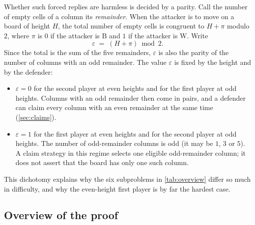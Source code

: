 \documentclass[11pt,a4paper]{article}
\theoremstyle{plain}
\theoremstyle{definition}
\newcommand{\B}{\mathrm{B}}
\newcommand{\W}{\mathrm{W}}
\newcommand{\eps}{\varepsilon}
\begin{document}
Whether such forced replies are harmless is decided by a parity. Call the number of empty cells of a column its \emph{remainder}. When the attacker is to move on a board of height $H$, the total number of empty cells is congruent to $H+\pi$ modulo $2$, where $\pi$ is $0$ if the attacker is $\B$ and $1$ if the attacker is $\W$. Write
\[
\eps \;=\; (H+\pi) \bmod 2 .
\]
Since the total is the sum of the five remainders, $\eps$ is also the parity of the number of columns with an odd remainder. The value $\eps$ is fixed by the height and by the defender:

\begin{itemize}
  \item $\eps=0$ for the second player at even heights and for the first player at odd heights. Columns with an odd remainder then come in pairs, and a defender can claim every column with an even remainder at the same time (\cref{sec:claims}).
  \item $\eps=1$ for the first player at even heights and for the second player at odd heights. The number of odd-remainder columns is odd (it may be $1$, $3$ or $5$). A claim strategy in this regime selects one eligible odd-remainder column; it does not assert that the board has only one such column.
\end{itemize}

This dichotomy explains why the six subproblems in \cref{tab:overview} differ so much in difficulty, and why the even-height first player is by far the hardest case.

\subsection{Overview of the proof}
\end{document}
